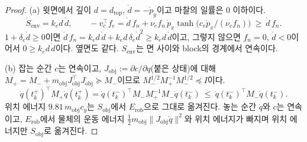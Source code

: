 \documentclass[11pt]{article}\usepackage[margin=1in]{geometry}\usepackage{amsmath,amssymb,amsthm,mathtools}\usepackage{graphicx}\graphicspath{{figures/}{../figures/}{figs/}{./}}\usepackage{enumitem}\usepackage{hyperref}\usepackage{cleveref}\usepackage{tikz}\usetikzlibrary{arrows.meta,positioning,calc,shapes.geometric}\usepackage{float}\usepackage{rotating}\usepackage[most]{tcolorbox}\usepackage{kotex}\usepackage{booktabs}\usepackage{longtable}\emergencystretch=1.6em\tolerance=2000 \crefname{assumption}{Assumption}{Assumptions}\Crefname{assumption}{Assumption}{Assumptions}\crefname{definition}{Definition}{Definitions}\Crefname{definition}{Definition}{Definitions}\crefname{proposition}{Proposition}{Propositions}\Crefname{proposition}{Proposition}{Propositions}\crefname{fact}{Fact}{Facts}\Crefname{fact}{Fact}{Facts} \newtheorem{assumption}{Assumption}\newtheorem{definition}{Definition}\newtheorem{lemma}{Lemma}\newtheorem{proposition}{Proposition}\newtheorem{theorem}{Theorem}\newtheorem{corollary}{Corollary}\newtheorem{fact}{Fact}\theoremstyle{remark}\newtheorem{remark}{Remark} \newcommand{\R}{\mathbb{R}}\newcommand{\xb}{\bar x}\newcommand{\Ab}{\bar A}\newcommand{\By}{\bar B_y}\newcommand{\U}{\mathcal U}\newcommand{\Z}{\mathcal Z}
\begin{document}
\begin{proof}
(a) 윗면에서 깊이 $d=d_{\mathrm{top}}$, $\dot d=-\dot p_y$이고 마찰의 일률은 0 이하이다.
\[
\dot S_{\mathrm{env}}=k_ed\,\dot d,\qquad -v_c^\top f_e=\dot d\,f_n+\nu_ef_n\,\dot p_x\tanh\big(c_v\dot p_x/(\nu_ef_n)\big)\ \ge\ \dot d\,f_n .
\]
$1+\delta_e\dot d\ge0$이면 $\dot d\,f_n=k_ed\,\dot d+k_ed\,\delta_e\dot d^2\ge k_ed\,\dot d$이고, 그렇지 않으면 $f_n=0$, $\dot d<0$이어서 $0\ge k_ed\,\dot d$이다. 옆면도 같다. $S_{\mathrm{env}}$는 면 사이와 block의 경계에서 연속이다.

(b) 잡는 순간 $c$는 연속이고, $J_{\mathrm{obj}}:=\partial c/\partial q$(붙은 상태)에 대해 $M_+=M_-+m_{\mathrm{obj}}J_{\mathrm{obj}}^\top J_{\mathrm{obj}}\succeq M_-$이므로 $M_-^{1/2}M_+^{-1}M_-^{1/2}\preceq I$이다.
\[
\dot q(t_k^+)^\top M_+\dot q(t_k^+)=\dot q(t_k^-)^\top M_-M_+^{-1}M_-\dot q(t_k^-)\ \le\ \dot q(t_k^-)^\top M_-\dot q(t_k^-) .
\]
위치 에너지 $9.81\,m_{\mathrm{obj}}c_y$는 $S_{\mathrm{obj}}$에서 $E_{\mathrm{rob}}$으로 그대로 옮겨진다. 놓는 순간 $\dot q$와 $c$는 연속이고, $E_{\mathrm{rob}}$에서 물체의 운동 에너지 $\tfrac12m_{\mathrm{obj}}\|J_{\mathrm{obj}}\dot q\|^2$와 위치 에너지가 빠지며 위치 에너지만 $S_{\mathrm{obj}}$로 옮겨진다.
\end{proof}
\end{document}
